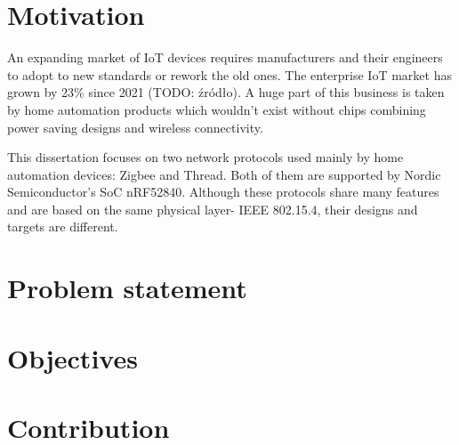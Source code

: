 
\section{Motivation}

An expanding market of IoT devices requires manufacturers and their engineers to adopt to new standards or rework 
the old ones. The enterprise IoT market has grown by 23\% since 2021 (TODO: źródło). A huge part of this business is taken
by home automation products which wouldn't exist without chips combining power saving designs and wireless connectivity.

This dissertation focuses on two network protocols used mainly by home automation devices: Zigbee and Thread.
Both of them are supported by Nordic Semiconductor's SoC nRF52840. Although these protocols share many features
and are based on the same physical layer- IEEE 802.15.4, their designs and targets are different.

\section{Problem statement}



\section{Objectives}

\section{Contribution}
